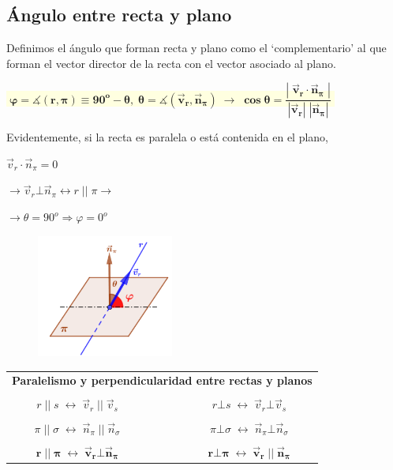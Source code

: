 \subsection{Ángulo entre recta y plano}


Definimos el ángulo que forman recta y plano como el `complementario' al  que forman el vector director de la recta con el vector asociado al plano.  



\vspace{3mm}\centerline{
\colorbox{LightYellow}{
$\boxed{ \boldsymbol{ \;\varphi=\measuredangle(r,\pi)\equiv 90^o-\theta,\;\theta=\measuredangle(\vec v_r,\vec n_{\pi}) \; \to \; \cos \theta = \dfrac {|\;\vec v_r \cdot \vec n_{\pi}\;|}{|\vec v_r|\;|\vec n_{\pi}|}\; } }$
}}



\justify

\begin{multicols}{2}
Evidentemente, si la recta es paralela o está contenida en el plano, 

$\vec v_r \cdot \vec n_{\pi}=0  $

$\to \vec v_r \bot \vec n_{\pi}\leftrightarrow r \;||\;\pi \to $ 

$\to\theta=90^o \Rightarrow \varphi=0^o$ 


	\begin{figure}[H]
		\centering
		\includegraphics[width=0.4\textwidth]{imagenes/imagenes11/T11IM06.png}
	\end{figure}	
\end{multicols}


\begin{table}[H]
\centering
\begin{tabular}{ccc}
\multicolumn{3}{c}{\textbf{Paralelismo y perpendicularidad entre rectas y planos}}                                                                                   \\ \\
$r\;||\;s \; \leftrightarrow \; \vec v_r \;||\; \vec v_s$                   & $\quad$ & $r \bot s \; \leftrightarrow \; \vec v_r \bot  \vec v_s$                     \\ \\
$\pi\;||\;\sigma \; \leftrightarrow \; \vec n_{\pi} \;||\; \vec n_{\sigma}$ &         & $\pi \bot \sigma \; \leftrightarrow \; \vec n_{\pi} \bot \vec n_{\sigma}$    \\ \\
$\boldsymbol{r\;||\;\pi \; \leftrightarrow \; \vec v_r \bot \vec n_{\pi}}$  &         & $\boldsymbol{r \bot \pi \; \leftrightarrow \; \vec v_r \;||\; \vec n_{\pi}}$
\end{tabular}
\end{table}


